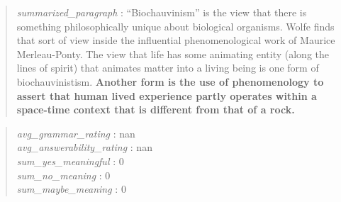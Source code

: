 \begin{quote}
\emph{summarized\_paragraph} : ``Biochauvinism'' is the view that there
is something philosophically unique about biological organisms. Wolfe
finds that sort of view inside the influential phenomenological work of
Maurice Merleau-Ponty. The view that life has some animating entity
(along the lines of spirit) that animates matter into a living being is
one form of biochauvinistism. \textbf{Another form is the use of
phenomenology to assert that human lived experience partly operates
within a space-time context that is different from that of a rock.}
\end{quote}

\begin{quote}
\emph{avg\_grammar\_rating} : nan\\
\emph{avg\_answerability\_rating} : nan\\
\emph{sum\_yes\_meaningful} : 0\\
\emph{sum\_no\_meaning} : 0\\
\emph{sum\_maybe\_meaning} : 0
\end{quote}
